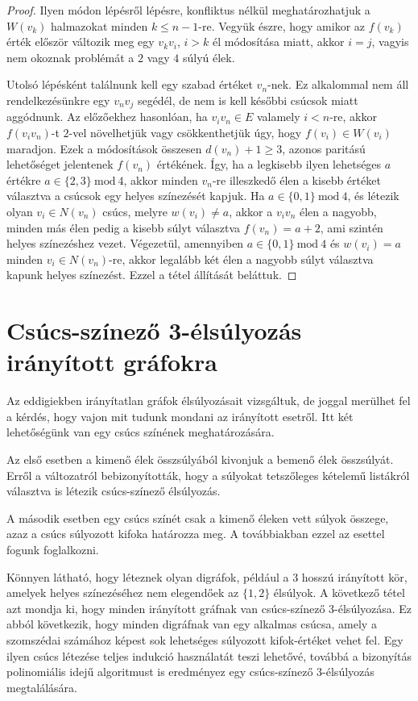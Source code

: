 \documentclass[12pt, a4paper]{report}
\theoremstyle{remark}
\theoremstyle{definition}
\begin{document}
\begin{proof}
Ilyen módon lépésről lépésre, konfliktus nélkül meghatározhatjuk a $W(v_k)$ halmazokat minden $k \leq n - 1$-re. Vegyük észre, hogy amikor az $f(v_k)$ érték először változik meg egy $v_k v_i$, $i > k$ él módosítása miatt, akkor $i = j$, vagyis nem okoznak problémát a $2$ vagy $4$ súlyú élek.

Utolsó lépésként találnunk kell egy szabad értéket $v_n$-nek. Ez alkalommal nem áll rendelkezésünkre egy $v_n v_j$ segédél, de nem is kell későbbi csúcsok miatt aggódnunk. Az előzőekhez hasonlóan, ha $v_i v_n \in E$ valamely $i < n$-re, akkor $f(v_i v_n)$-t $2$-vel növelhetjük vagy csökkenthetjük úgy, hogy $f(v_i) \in W(v_i)$ maradjon. Ezek a módosítások összesen $d(v_n) +1 \geq 3$, azonos paritású lehetőséget jelentenek $f(v_n)$ értékének. Így, ha a legkisebb ilyen lehetséges $a$ értékre $a \in \lbrace 2, 3 \rbrace\ \mathrm{mod}\ 4$, akkor minden $v_n$-re illeszkedő élen a kisebb értéket választva a csúcsok egy helyes színezését kapjuk. Ha $a \in \lbrace 0, 1 \rbrace\ \mathrm{mod}\ 4$, és létezik olyan $v_i \in N(v_n)$ csúcs, melyre $w(v_i) \neq a$, akkor a $v_i v_n$ élen a nagyobb, minden más élen pedig a kisebb súlyt választva $f(v_n) = a + 2$, ami szintén helyes színezéshez vezet. Végezetül, amennyiben $a \in \lbrace 0, 1 \rbrace\ \mathrm{mod}\ 4$ és $w(v_i) = a$ minden $v_i \in N(v_n)$-re, akkor legalább két élen a nagyobb súlyt választva kapunk helyes színezést. Ezzel a tétel állítását beláttuk.
\end{proof}

\section{Csúcs-színező 3-élsúlyozás irányított gráfokra}
Az eddigiekben irányítatlan gráfok élsúlyozásait vizsgáltuk, de joggal merülhet fel a kérdés, hogy vajon mit tudunk mondani az irányított esetről. Itt két lehetőségünk van egy csúcs színének meghatározására. 

Az első esetben a kimenő élek összsúlyából kivonjuk a bemenő élek összsúlyát. Erről a változatról \citeauthor{Bartnicki2009} \cite{Bartnicki2009} bebizonyították, hogy a súlyokat tetszőleges kételemű listákról választva is létezik csúcs-színező élsúlyozás.

A második esetben egy csúcs színét csak a kimenő éleken vett súlyok összege, azaz a csúcs súlyozott kifoka határozza meg. A továbbiakban ezzel az esettel fogunk foglalkozni.

Könnyen látható, hogy léteznek olyan digráfok, például a $3$ hosszú irányított kör, amelyek helyes színezéséhez nem elegendőek az $\lbrace 1, 2 \rbrace$ élsúlyok. A következő tétel azt mondja ki, hogy minden irányított gráfnak van csúcs-színező 3-élsúlyozása. Ez abból következik, hogy minden digráfnak van egy alkalmas csúcsa, amely a szomszédai számához képest sok lehetséges súlyozott kifok-értéket vehet fel. Egy ilyen csúcs létezése teljes indukció használatát teszi lehetővé, továbbá a bizonyítás polinomiális idejű algoritmust is eredményez egy csúcs-színező 3-élsúlyozás megtalálására.
\end{document}
